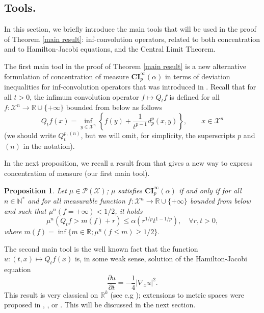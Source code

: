 \documentclass[11pt]{amsart}
\newtheorem{prop}[equation]{Proposition}
\numberwithin{equation}{section}
\begin{document}
\subsection{Tools.}
In this section, we briefly introduce the main tools that will be used in the proof of Theorem \ref{main result}: inf-convolution operators, related to both concentration and to Hamilton-Jacobi equations, and the Central Limit Theorem.

The first main tool in the proof of Theorem \ref{main result} is a new alternative formulation of concentration of measure  $\mathbf{CI}_p^\infty(\alpha)$   in terms of deviation inequalities for inf-convolution operators that was introduced in \cite{GRS11}. 
Recall that for all $t>0$, the infimum convolution operator $f\mapsto Q_t f$ is defined for all $f:{\mathcal{X}}^n \to {\mathbb{R}}\cup\{+\infty\}$ bounded from below as follows
\begin{equation}\label{operator}
Q_tf(x)=\inf_{y\in {\mathcal{X}}^n}\left\{ f(y) + \frac{1}{t^{p-1}} d^p_p(x,y)\right\},\qquad x\in {\mathcal{X}}^n
\end{equation}
(we should write $Q_t^{p,(n)}$, but we will omit, for simplicity, the superscripts $p$ and $(n)$ in the notation).

In the next proposition, we recall a result from \cite{GRS11}  that gives a new way to express concentration of measure (our first main tool).
\begin{prop}\label{prop-GRS11}
Let $\mu \in \mathcal{P}({\mathcal{X}})$; $\mu$ satisfies $\mathbf{CI}_p^\infty(\alpha)$ if and only if for all $n\in {\mathbb{N}}^*$ and for all measurable function $f:{\mathcal{X}}^n \to {\mathbb{R}}\cup\{+\infty\}$ bounded from below and such that $\mu^n(f=+\infty)<1/2$, it holds
\begin{equation}\label{eq-GRS11}
 \mu^n(Q_t f > m(f) +r)\leq \alpha(r^{1/p}t^{1-1/p}),\quad \forall r,t>0,
 \end{equation}
where $m(f)=\inf\{m\in{\mathbb{R}};\mu^n(f\leq m) \geq 1/2\}.$
\end{prop}

The second main tool is the well known fact that the function $u:(t,x) \mapsto Q_tf(x)$ is, in some weak sense,  solution of the Hamilton-Jacobi equation 
\[
\frac{\partial u}{\partial t} = -\frac{1}{4} |\nabla_x u|^2.
\]
This result is very classical on ${\mathbb{R}}^k$ (see e.g \cite{Evans}); extensions to metric spaces were proposed in \cite{LV07}, \cite{Ba12}, \cite{AGS12} or \cite{GRS12}. This will be discussed in the next section.
\end{document}
